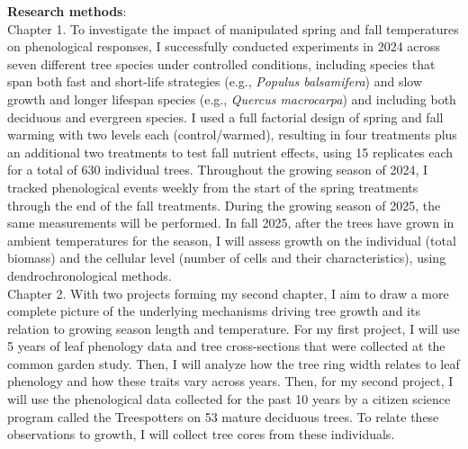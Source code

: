 \documentclass[11pt,letter]{article}
\begin{document}
\par
\textbf{Research methods}: \\
Chapter 1. To investigate the impact of manipulated spring and fall temperatures on phenological responses, I successfully conducted experiments in 2024 across seven different tree species under controlled conditions, including species that span both fast and short-life strategies (e.g., \textit{Populus balsamifera}) and slow growth and longer lifespan species (e.g., \textit{Quercus macrocarpa}) and including both deciduous and evergreen species. \citep{jonsson_annual_2010}  I used a full factorial design of spring and fall warming with two levels each (control/warmed), resulting in four treatments plus an additional two treatments to test fall nutrient effects, using 15 replicates each for a total of 630 individual trees. Throughout the growing season of 2024, I tracked phenological events weekly from the start of the spring treatments through the end of the fall treatments. During the growing season of 2025, the same measurements will be performed. In fall 2025, after the trees have grown in ambient temperatures for the season, I will assess growth on the individual (total biomass) and the cellular level (number of cells and their characteristics), using dendrochronological methods.\\
Chapter 2. 
With two projects forming my second chapter, I aim to draw a more complete picture of the underlying mechanisms driving tree growth and its relation to growing season length and temperature. For my first project, I will use 5 years of leaf phenology data and tree cross-sections that were collected at the common garden study. Then, I will analyze how the tree ring width relates to leaf phenology and how these traits vary across years. Then, for my second project, I will use the phenological data collected for the past 10 years by a citizen science program called the Treespotters on 53 mature deciduous trees. To relate these observations to growth, I will collect tree cores from these individuals.  
\end{document}
